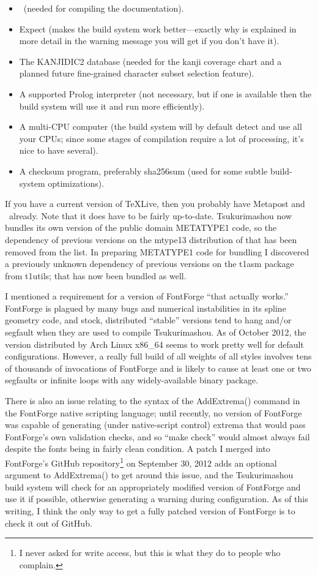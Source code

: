 \documentclass[14pt]{extarticle}
\begin{document}
\begin{itemize}
  \item \XeLaTeX\ (needed for compiling the documentation).
  \item Expect (makes the build system work better---exactly why is
    explained in more detail in the warning message
    you will get if you don't have it).
  \item The KANJIDIC2 database (needed for the kanji coverage chart and
    a planned future fine-grained character subset selection feature).
  \item A supported Prolog interpreter (not necessary, but if one is
    available then the build system will use it and run more efficiently).
  \item A multi-CPU computer (the build system will by default detect and
    use all your CPUs; since some stages of compilation require a lot of
    processing, it's nice to have several).
  \item A checksum program, preferably sha256sum (used for some subtle
    build-system optimizations).
\end{itemize}

If you have a current version of \TeX{}Live, then you probably have
Metapost and \XeLaTeX\ already.  Note that it does have to be fairly
up-to-date.  Tsukurimashou now bundles its own version of the public domain
METATYPE1 code, so the dependency of previous versions
on the mtype13 distribution of that has been removed from the list.  In
preparing METATYPE1 code for bundling I discovered a previously unknown
dependency of previous versions on the t1asm package from t1utils; that has
now been bundled as well.

I mentioned a requirement for a version of FontForge ``that actually
works.'' FontForge is plagued by many bugs and numerical instabilities in
its spline geometry code, and stock, distributed ``stable'' versions tend to
hang and/or segfault when they are used to compile Tsukurimashou.  As of
October 2012, the version distributed by Arch Linux x86\_64 seems to work
pretty well for default configurations.  However, a really full build of all
weights of all styles involves tens of thousands of invocations of FontForge
and is likely to cause at least one or two segfaults or infinite loops with
any widely-available binary package.

There is also an issue relating to the syntax of the AddExtrema() command in
the FontForge native scripting language; until recently, no version of
FontForge was capable of generating (under native-script control) extrema
that would pass FontForge's own validation checks, and so ``make check''
would almost always fail despite the fonts being in fairly clean
condition.  A patch I merged into FontForge's GitHub repository\footnote{I
never asked for write access, but this is what they do to people who
complain.} on September 30, 2012 adds an optional argument to
AddExtrema() to get around this issue, and the Tsukurimashou build system
will check for an appropriately modified version of FontForge and use it if
possible, otherwise generating a warning during configuration.  As of this
writing, I think the only way to get a fully patched version of FontForge is
to check it out of GitHub.
\end{document}
